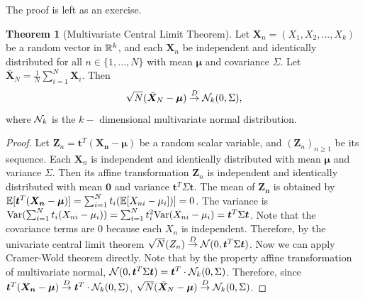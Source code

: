 \documentclass[10pt]{article}
\theoremstyle{definition}
\newtheorem{theorem}{Theorem}
\numberwithin{equation}{section}
\begin{document}
The proof is left as an exercise.  

\begin{theorem}[Multivariate Central Limit Theorem]
Let $\bm{X}_n = (X_{1}, X_{2}, ..., X_{k})$ be a random vector in $\mathbb{R}^k$, and each $\bm{X}_n$ be independent and identically distributed for all $n \in \{1,...,N\}$ with mean $\bm{\mu}$ and covariance $\Sigma$. Let $\bar{\bm{X}}_N = \frac{1}{N} \sum_{i=1}^{N} \bm{X}_i$. Then
\begin{equation}
	\sqrt{N}(\bar{\bm{X}}_N - \bm{\mu}) \overset{D}{\to} \mathcal{N}_k(0,\Sigma), 
\end{equation}
where $\mathcal{N}_k$ is the $k-$ dimensional multivariate normal distribution.
\begin{proof}
	Let $\bm{Z}_n = \bm{t}^T(\bm{X_n}-\bm{\mu})$ be a random scalar variable, and $(\bm{Z}_n)_{n \geq 1}$ be its sequence. Each $\bm{X}_n$ is independent and identically distributed with mean $\bm{\mu}$ and variance $\Sigma$. Then its affine transformation $\bm{Z}_n$ is independent and identically distributed with mean $\bm{0}$ and variance $\bm{t}^T \Sigma \bm{t}$.  The mean of $\bm{Z_n}$ is obtained by $\mathbb{E}[\bm{t}^T(\bm{X_n}-\bm{\mu})]= \sum_{i=1}^{N} t_i(\mathbb{E}[X_{ni} - \mu_i])] = 0$. The variance is $\text{Var}(\sum_{i=1}^{N} t_i(X_{ni}-\mu_i)) = \sum_{i=1}^{N} t_i^2 \text{Var}(X_{ni} - \mu_i) = \bm{t}^T \Sigma \bm{t}$. Note that the covariance terms are 0 because each $X_{n}$ is independent. Therefore, by the univariate central limit theorem $\sqrt{N}(Z_n) \overset{D}{\to} \mathcal{N}(0,\bm{t}^T \Sigma \bm{t})$. Now we can apply Cramer-Wold theorem directly. Note that by the property affine transformation of multivariate normal, $ \mathcal{N}(0,\bm{t}^T \Sigma \bm{t}) = \bm{t}^T \cdot \mathcal{N}_k(0,\Sigma)$. Therefore, since $\bm{t}^T(\bm{X_n}-\bm{\mu}) \overset{D}{\to} \bm{t}^T \cdot \mathcal{N}_k(0,\Sigma)$, $\sqrt{N}(\bar{\bm{X}}_N - \bm{\mu}) \overset{D}{\to} \mathcal{N}_k(0,\Sigma)$.
\end{proof}
\end{theorem}
\end{document}
